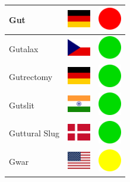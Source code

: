 \documentclass[12pt, a4paper, twoside]{report}
\begin{document}
\begin{center}
\begin{longtable}{|p{5cm}|p{2cm}|p{2cm}|}
 Gut                                                        & \includegraphics[width=1cm]{../4x3/de} &   \includegraphics[width=1cm]{../likes/n} \\ \hline
 Gutalax                                                    & \includegraphics[width=1cm]{../4x3/cz} &   \includegraphics[width=1cm]{../likes/y} \\ \hline
 Gutrectomy                                                 & \includegraphics[width=1cm]{../4x3/de} &   \includegraphics[width=1cm]{../likes/y} \\ \hline
 Gutslit                                                    & \includegraphics[width=1cm]{../4x3/in} &   \includegraphics[width=1cm]{../likes/y} \\ \hline
 Guttural Slug                                              & \includegraphics[width=1cm]{../4x3/dk} &   \includegraphics[width=1cm]{../likes/y} \\ \hline
 Gwar                                                       & \includegraphics[width=1cm]{../4x3/us} &   \includegraphics[width=1cm]{../likes/m} \\ \hline

\end{longtable}
\end{center}
\end{document}
